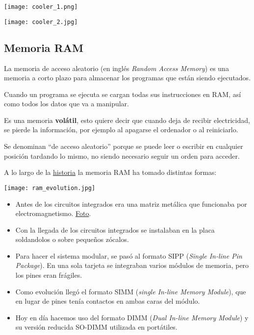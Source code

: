 {
\hfill
\begin{minipage}{0.3\linewidth}
    \texttt{[image: cooler\_1.png]}
\end{minipage}
\hfill
\begin{minipage}{0.5\linewidth}
    \texttt{[image: cooler\_2.jpg]}
\end{minipage}
\hfill
\vspace{30pt}
}


\subsection{Memoria RAM}

\begin{minipage}{0.6\linewidth}
\setlength{\parskip}{1.2em}
La memoria de acceso aleatorio (en inglés \textit{Random Access Memory}) es una memoria a corto plazo para almacenar los programas que están siendo ejecutados.

Cuando un programa se ejecuta se cargan todas sus instrucciones en RAM, así como todos los datos que va a manipular.

Es una memoria \textbf{volátil}, esto quiere decir que cuando deja de recibir electricidad, se pierde la información, por ejemplo al apagarse el ordenador o al reiniciarlo.

Se denominan “de acceso aleatorio” porque se puede leer o escribir en cualquier posición tardando lo mismo, no siendo necesario seguir un orden para acceder.

A lo largo de la \href{https://es.wikipedia.org/wiki/Memoria_de_acceso_aleatorio\#M%C3%B3dulos_de_RAM}{historia} la memoria RAM ha tomado distintas formas:
\end{minipage}
\hfill
\begin{minipage}{0.35\linewidth}
    \texttt{[image: ram\_evolution.jpg]}
    \vspace{-30pt}
\end{minipage}

\begin{itemize}
    \item Antes de los circuitos integrados era una matriz metálica que funcionaba por electromagnetismo. \href{https://es.wikipedia.org/wiki/Memoria_de_acceso_aleatorio#/media/Archivo:Electronic_Memory.jpg}{Foto}.
    \item Con la llegada de los circuitos integrados se instalaban en la placa soldandolos o sobre pequeños zócalos.
    \item Para hacer el sistema modular, se pasó al formato SIPP (\textit{Single In-line Pin Package}). En una sola tarjeta se integraban varios módulos de memoria, pero los pines eran frágiles.
    \item Como evolución llegó el formato SIMM (\textit{single In-line Memory Module}), que en lugar de pines tenía contactos en ambas caras del módulo.
    \item Hoy en día hacemos uso del formato DIMM (\textit{Dual In-line Memory Module}) y su versión reducida SO-DIMM utilizada en portátiles.
\end{itemize}


